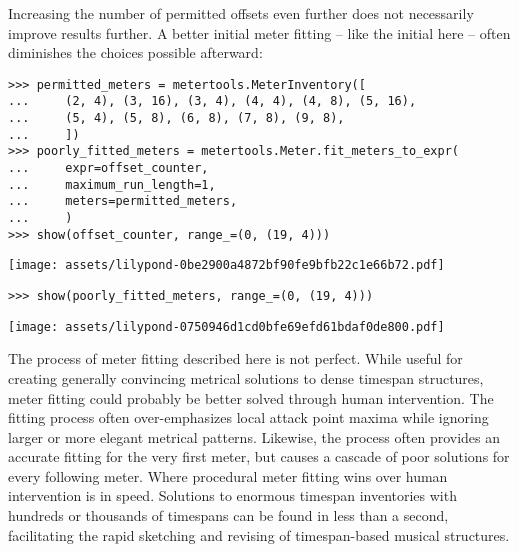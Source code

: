\noindent Increasing the number of permitted offsets even further does not
necessarily improve results further. A better initial meter fitting -- like the
initial  here -- often diminishes the choices possible afterward:

\begin{comment}
<abjad>
permitted_meters = metertools.MeterInventory([
    (2, 4), (3, 16), (3, 4), (4, 4), (4, 8), (5, 16),
    (5, 4), (5, 8), (6, 8), (7, 8), (9, 8),
    ])
poorly_fitted_meters = metertools.Meter.fit_meters_to_expr(
    expr=offset_counter,
    maximum_run_length=1,
    meters=permitted_meters,
    )
show(offset_counter, range_=(0, (19, 4)))
show(poorly_fitted_meters, range_=(0, (19, 4)))
</abjad>
\end{comment}

\begin{abjadbookoutput}
\begin{singlespacing}
\vspace{-0.5\baselineskip}
\begin{verbatim}
>>> permitted_meters = metertools.MeterInventory([
...     (2, 4), (3, 16), (3, 4), (4, 4), (4, 8), (5, 16),
...     (5, 4), (5, 8), (6, 8), (7, 8), (9, 8),
...     ])
>>> poorly_fitted_meters = metertools.Meter.fit_meters_to_expr(
...     expr=offset_counter,
...     maximum_run_length=1,
...     meters=permitted_meters,
...     )
>>> show(offset_counter, range_=(0, (19, 4)))
\end{verbatim}
\noindent\texttt{[image: assets/lilypond-0be2900a4872bf90fe9bfb22c1e66b72.pdf]}
\begin{verbatim}
>>> show(poorly_fitted_meters, range_=(0, (19, 4)))
\end{verbatim}
\noindent\texttt{[image: assets/lilypond-0750946d1cd0bfe69efd61bdaf0de800.pdf]}
\end{singlespacing}
\end{abjadbookoutput}

\noindent The process of meter fitting described here is not perfect. While
useful for creating generally convincing metrical solutions to dense timespan
structures, meter fitting could probably be better solved through human
intervention. The fitting process often over-emphasizes local attack point
maxima while ignoring larger or more elegant metrical patterns. Likewise, the
process often provides an accurate fitting for the very first meter, but causes
a cascade of poor solutions for every following meter. Where procedural meter
fitting wins over human intervention is in speed. Solutions to enormous
timespan inventories with hundreds or thousands of timespans can be found in
less than a second, facilitating the rapid sketching and revising of
timespan-based musical structures.

